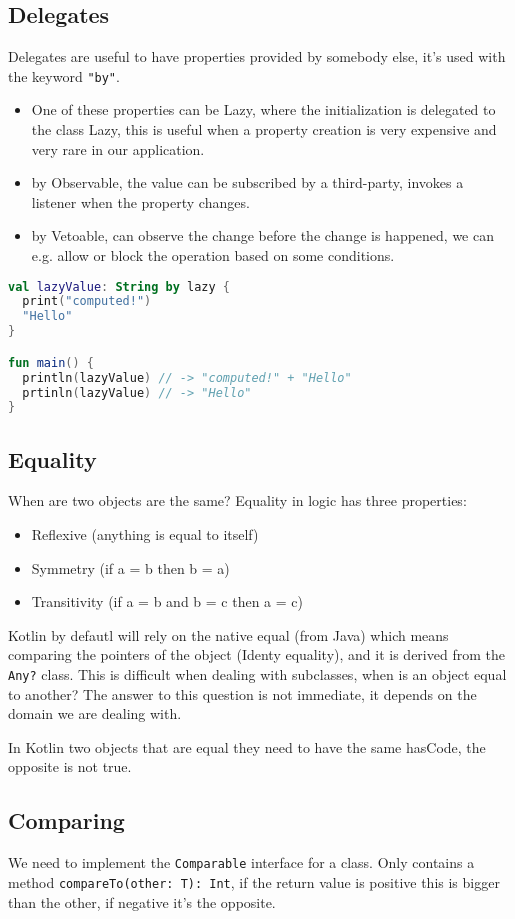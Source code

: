 \documentclass[12pt]{article}
\begin{document}
\subsection{Delegates}
Delegates are useful to have properties provided by somebody else, it's used with the keyword \texttt{"by"}.
\begin{itemize}
  \item One of these properties can be Lazy, where the initialization is delegated to the class Lazy, this is useful when a property creation is very expensive and very rare in our application.
  \item by Observable, the value can be subscribed by a third-party, invokes a listener when the property changes.
  \item by Vetoable, can observe the change before the change is happened, we can e.g. allow or block the operation based on some conditions.
\end{itemize}
\begin{lstlisting}[language=kotlin, caption={Lazy example}]
val lazyValue: String by lazy { 
  print("computed!")
  "Hello"
}

fun main() {
  println(lazyValue) // -> "computed!" + "Hello"
  prtinln(lazyValue) // -> "Hello"
}
\end{lstlisting}


\subsection{Equality}
When are two objects are the same? Equality in logic has three properties:
\begin{itemize}
  \item Reflexive (anything is equal to itself)
  \item Symmetry (if a = b then b = a)
  \item Transitivity (if a = b and b = c then a = c)
\end{itemize}
Kotlin by defautl will rely on the native equal (from Java) which means comparing the pointers of the object (Identy equality), and it is derived from the \texttt{Any?} class. This is difficult when dealing with subclasses, when is an object equal to another? The answer to this question is not immediate, it depends on the domain we are dealing with.

In Kotlin two objects that are equal they need to have the same hasCode, the opposite is not true.


\subsection{Comparing}
We need to implement the \texttt{Comparable} interface for a class. Only contains a method \texttt{compareTo(other: T): Int}, if the return value is positive this is bigger than the other, if negative it's the opposite.
\end{document}
